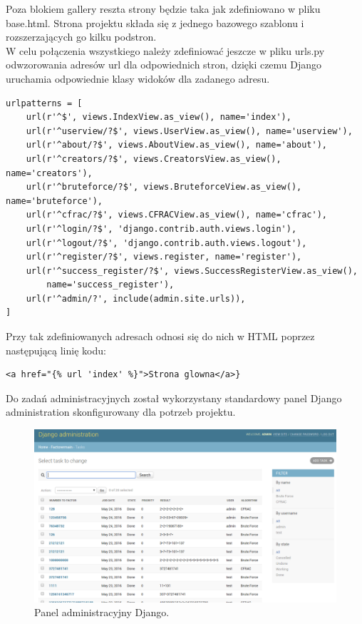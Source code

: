 \documentclass{article}
\begin{document}
Poza blokiem gallery reszta strony będzie taka jak zdefiniowano w pliku base.html. Strona projektu składa się z jednego bazowego szablonu i rozszerzających go kilku podstron.\\

W celu połączenia wszystkiego należy zdefiniować jeszcze w pliku urls.py odwzorowania adresów url dla odpowiednich stron, dzięki czemu Django uruchamia odpowiednie klasy widoków dla zadanego adresu.

\begin{lstlisting}
urlpatterns = [
    url(r'^$', views.IndexView.as_view(), name='index'),
    url(r'^userview/?$', views.UserView.as_view(), name='userview'),
    url(r'^about/?$', views.AboutView.as_view(), name='about'),
    url(r'^creators/?$', views.CreatorsView.as_view(), name='creators'),
    url(r'^bruteforce/?$', views.BruteforceView.as_view(), name='bruteforce'),
    url(r'^cfrac/?$', views.CFRACView.as_view(), name='cfrac'),
    url(r'^login/?$', 'django.contrib.auth.views.login'),
    url(r'^logout/?$', 'django.contrib.auth.views.logout'),
    url(r'^register/?$', views.register, name='register'),
    url(r'^success_register/?$', views.SuccessRegisterView.as_view(),
        name='success_register'),
    url(r'^admin/?', include(admin.site.urls)),
]
\end{lstlisting}

Przy tak zdefiniowanych adresach odnosi się do nich w HTML poprzez następującą linię kodu:
\begin{lstlisting}
<a href="{% url 'index' %}">Strona glowna</a>}
\end{lstlisting}

Do zadań administracyjnych został wykorzystany standardowy panel Django administration skonfigurowany dla potrzeb projektu.

\begin{figure}[h!]
    \includegraphics[width=\linewidth]{adminpage.png}
    \caption{Panel administracyjny Django.}
    \label{fig:adminpagescr}
\end{figure}
\end{document}

